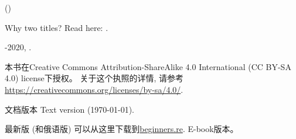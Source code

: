 \documentclass[UTF8,nofonts]{ctexart}
\begin{document}

\begin{titlepage}


\end{titlepage}

\newpage

\begin{center}
\vspace*{\fill}
{\LARGE \TitleMain}

\bigskip

{\large (\TitleAux)}

\bigskip
\bigskip
Why two titles? Read here: . %

\vspace*{\fill}

{\large \AUTHOR}

{\large \TT{\EMAILPRI}}
\vspace*{\fill}
\vfill

\ccbysa

-2020, \AUTHOR. 

本书在Creative Commons Attribution-ShareAlike 4.0 International (CC BY-SA 4.0) license下授权。
关于这个执照的详情, 请参考\url{https://creativecommons.org/licenses/by-sa/4.0/}.

文档版本 Text version ({\large \today}).

最新版 (和俄语版) 可以从这里下载到\href{http://go.yurichev.com/17009}{beginners.re}.
E-book版本。

\end{center}
\end{document}
